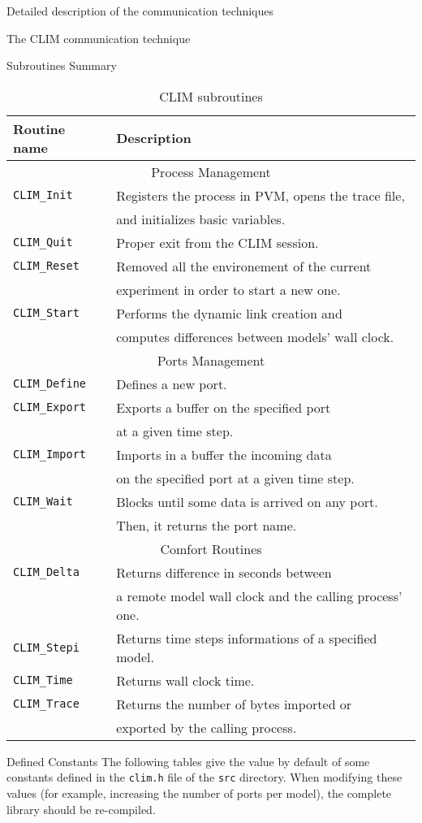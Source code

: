 \begin{section}{Detailed description of the communication techniques}
\begin{subsection}{The CLIM communication technique}
\begin{subsubsection}{Subroutines Summary}
\begin{table}[hbtp]
\begin{center}
\begin{tabular}{|l|l|}
\hline
Routine name & Description \\
\hline
\hline
\multicolumn{2}{|c|}{Process Management} \\
\hline
{\tt CLIM\_Init }& Registers the process in PVM, opens the trace file,
\\
 & and initializes basic variables. \\
{\tt CLIM\_Quit }& Proper exit from the CLIM session. \\
{\tt CLIM\_Reset}& Removed all the environement of the current \\
 & experiment in order to start a new one. \\
{\tt CLIM\_Start}& Performs the dynamic link creation and \\
 & computes differences between models' wall clock. \\
\hline
\multicolumn{2}{|c|}{Ports Management} \\
\hline
{\tt CLIM\_Define}& Defines a new port. \\
{\tt CLIM\_Export}& Exports a buffer on the specified port \\
& at a given time step. \\
{\tt CLIM\_Import}& Imports in a buffer the incoming data  \\
& on the specified port at a given time step. \\
{\tt CLIM\_Wait }& Blocks until some data is arrived on any port. \\
& Then, it returns the port name. \\
\hline
\multicolumn{2}{|c|}{Comfort Routines} \\
\hline
{\tt CLIM\_Delta}& Returns difference in seconds between \\
& a remote model wall clock and the calling process' one.\\
{\tt CLIM\_Stepi}& Returns time steps informations of a specified model.
\\
{\tt CLIM\_Time }& Returns wall clock time. \\
{\tt CLIM\_Trace}& Returns the number of bytes imported or \\
& exported by the calling process. \\
\hline
\end{tabular}
\end{center}
\caption{CLIM subroutines}
\label{tab.clim}
\end{table}
%
\end{subsubsection}
%
\begin{subsubsection}{Defined Constants}
%
The following tables give the value by default of some constants
defined in the {\tt clim.h} file of the {\tt src} directory.
When modifying these values (for example, increasing the number of
ports per model), the complete library should be re-compiled.


\end{subsubsection}
\end{subsection}
\end{section}
